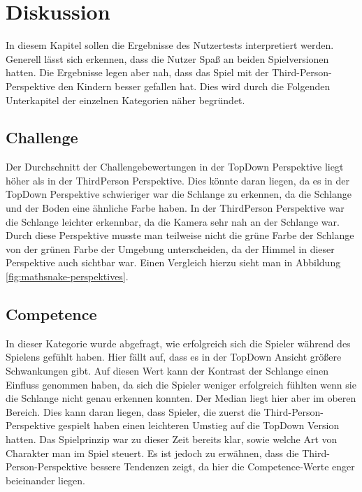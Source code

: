 
\chapter{Diskussion} %
\label{chap:discussion}
In diesem Kapitel sollen die Ergebnisse des Nutzertests interpretiert werden. Generell lässt sich erkennen, dass die Nutzer Spaß an beiden Spielversionen hatten. Die Ergebnisse legen aber nah, dass das Spiel mit der Third-Person-Perspektive den Kindern besser gefallen hat. Dies wird durch die Folgenden Unterkapitel der einzelnen Kategorien näher begründet.
\section{Challenge}
\label{sec:challengeDisk}
Der Durchschnitt der Challengebewertungen in der TopDown Perspektive liegt höher als in der ThirdPerson Perspektive. Dies könnte daran liegen, da es in der TopDown Perspektive schwieriger war die Schlange zu erkennen, da die Schlange und der Boden eine ähnliche Farbe haben. In der ThirdPerson Perspektive war die Schlange leichter erkennbar, da die Kamera sehr nah an der Schlange war. Durch diese Perspektive musste man teilweise nicht die grüne Farbe der Schlange von der grünen Farbe der Umgebung unterscheiden, da der Himmel in dieser Perspektive auch sichtbar war. Einen Vergleich hierzu sieht man in Abbildung \ref{fig:mathsnake-perspektives}.

\section{Competence}
\label{sec:competenceDisk}
In dieser Kategorie wurde abgefragt, wie erfolgreich sich die Spieler während des Spielens gefühlt haben. Hier fällt auf, dass es in der TopDown Ansicht größere Schwankungen gibt. Auf diesen Wert kann der Kontrast der Schlange einen Einfluss genommen haben, da sich die Spieler weniger erfolgreich fühlten wenn sie die Schlange nicht genau erkennen konnten. Der Median liegt hier aber im oberen Bereich. Dies kann daran liegen, dass Spieler, die zuerst die Third-Person-Perspektive gespielt haben einen leichteren Umstieg auf die TopDown Version hatten. Das Spielprinzip war zu dieser Zeit bereits klar, sowie welche Art von Charakter man im Spiel steuert. Es ist jedoch zu erwähnen, dass die Third-Person-Perspektive bessere Tendenzen zeigt, da hier die Competence-Werte enger beieinander liegen.

